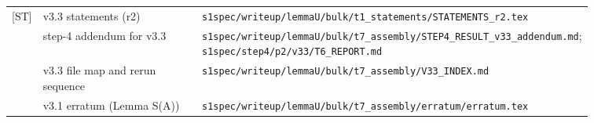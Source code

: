 \documentclass[11pt]{amsart}
\theoremstyle{definition}
\theoremstyle{remark}
\newcommand{\dref}[1]{[\textsf{#1}]}
\newcommand{\pth}[1]{\nolinkurl{#1}}
\begin{document}
\begin{center}
\begin{tabular}{@{}lp{0.30\linewidth}p{0.56\linewidth}@{}}
\dref{ST} & v3.3 statements (r2) & \pth{s1spec/writeup/lemmaU/bulk/t1_statements/STATEMENTS_r2.tex}\\
\dref{R4v33} & step-4 addendum for v3.3 & \pth{s1spec/writeup/lemmaU/bulk/t7_assembly/STEP4_RESULT_v33_addendum.md}; \pth{s1spec/step4/p2/v33/T6_REPORT.md}\\
\dref{IDX} & v3.3 file map and rerun sequence & \pth{s1spec/writeup/lemmaU/bulk/t7_assembly/V33_INDEX.md}\\
\dref{ERR} & v3.1 erratum (Lemma S(A)) & \pth{s1spec/writeup/lemmaU/bulk/t7_assembly/erratum/erratum.tex}\\\bottomrule
\end{tabular}\end{center}



\end{document}

